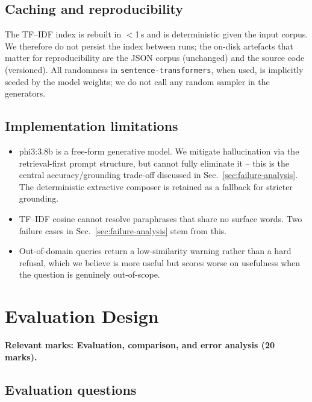 \documentclass[10pt,twocolumn,a4paper]{article}
\begin{document}
\subsection{Caching and reproducibility}

The TF--IDF index is rebuilt in $<$1\,s and is deterministic given the
input corpus. We therefore do not persist the index between runs; the
on-disk artefacts that matter for reproducibility are the JSON corpus
(unchanged) and the source code (versioned). All randomness in
\verb|sentence-transformers|, when used, is implicitly seeded by the
model weights; we do not call any random sampler in the generators.

\subsection{Implementation limitations}

\begin{itemize}
    \item phi3:3.8b is a free-form generative model. We mitigate
        hallucination via the retrieval-first prompt structure, but
        cannot fully eliminate it -- this is the central
        accuracy/grounding trade-off discussed in
        Sec.~\ref{sec:failure-analysis}. The deterministic extractive
        composer is retained as a fallback for stricter grounding.
    \item TF--IDF cosine cannot resolve paraphrases that share no
        surface words. Two failure cases in
        Sec.~\ref{sec:failure-analysis} stem from this.
    \item Out-of-domain queries return a low-similarity warning rather
        than a hard refusal, which we believe is more useful but
        scores worse on usefulness when the question is genuinely
        out-of-scope.
\end{itemize}

\section{Evaluation Design}
\label{sec:evaluation-design}

\textbf{Relevant marks: Evaluation, comparison, and error analysis (20 marks).}

\subsection{Evaluation questions}
\end{document}

